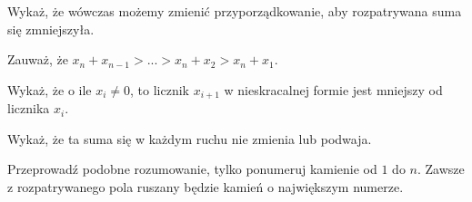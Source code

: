 
\begin{hints_list}
	\item Wykaż, że wówczas możemy zmienić przyporządkowanie, aby rozpatrywana suma się zmniejszyła.
	\item Zauważ, że $x_n + x_{n - 1} > ... > x_n + x_2 > x_n + x_1$.
	\item Wykaż, że o ile $x_{i} \neq 0$, to licznik $x_{i + 1}$ w nieskracalnej formie jest mniejszy od licznika $x_i$.
	\item *
	\item Wykaż, że ta suma się w każdym ruchu nie zmienia lub podwaja.
	\item Przeprowadź podobne rozumowanie, tylko ponumeruj kamienie od $1$ do $n$. Zawsze z rozpatrywanego pola ruszany będzie kamień o największym numerze.
\end{hints_list}